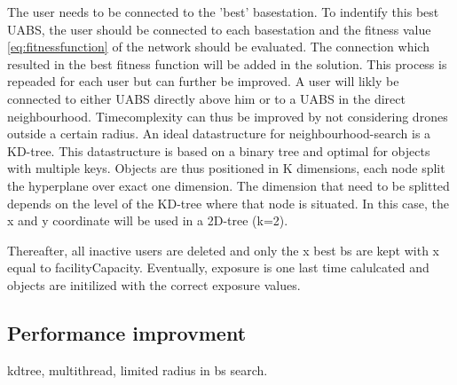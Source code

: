 The user needs to be connected to the 'best' basestation. To indentify this best \gls{UABS}, the user should be connected 
to each basestation and the fitness value \ref{eq:fitnessfunction} of the network should be evaluated. The connection which resulted in the best fitness function
will be added in the solution. This process is repeaded for each user but can further be improved. A user will likly be connected to either 
\gls{UABS} directly above him or to a \gls{UABS} in the direct neighbourhood. Timecomplexity can thus be improved by not considering drones 
outside a certain radius.
An ideal datastructure for neighbourhood-search is a KD-tree. This datastructure is based on a binary tree and optimal for objects with 
multiple keys. Objects are thus positioned in K dimensions, each node split the hyperplane over exact one dimension. The dimension that need 
to be splitted depends on the level of the KD-tree where that node is situated.
In this case, the x and y coordinate will be used in a 2D-tree (k=2).

Thereafter, all inactive users are deleted and only the x best bs are kept with x equal to facilityCapacity.
Eventually, exposure is one last time calulcated and objects are initilized with the correct exposure values.

\subsection{Performance improvment}
kdtree, multithread, limited radius in bs search.